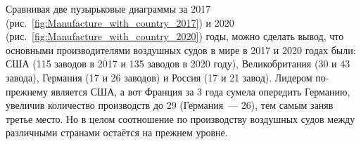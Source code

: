 Сравнивая две пузырьковые диаграммы за 2017 (рис.~\ref{fig:Manufacture_with_country_2017}) и 2020 (рис.~\ref{fig:Manufacture_with_country_2020}) годы, можно сделать вывод, что основными производителями воздушных судов в мире 
в 2017 и 2020 годах были: США (115 заводов в 2017 и 135 заводов в 2020 году), Великобритания (30 и 43 завода), Германия (17 и 26 заводов) и Россия (17 и 21 завод). Лидером по-прежнему является США, 
а вот Франция за 3 года сумела опередить Германию, 
увеличив количество производств до 29 (Германия~--- 26), 
тем самым заняв третье место. 
Но в целом соотношение по производству воздушных судов между различными странами остаётся на прежнем уровне.







